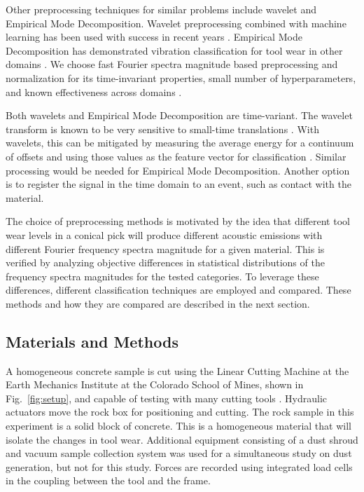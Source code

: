Other preprocessing techniques for similar problems include wavelet and Empirical Mode Decomposition.
Wavelet preprocessing combined with machine learning
has been used with success in recent years 
 \cite{he2013vibration, sadegh2016classification, skariah2021health}.
Empirical Mode Decomposition has demonstrated vibration classification for tool wear
 in other domains \cite{Xu2009, Nie2011, Zhan2014}.
We choose fast Fourier spectra magnitude based preprocessing and normalization for its time-invariant properties,
small number of hyperparameters, and known effectiveness across domains \cite{Xu2016, Harlianto2022}.

Both wavelets and Empirical Mode Decomposition are time-variant.
The wavelet transform is known to be very sensitive to small-time translations \cite{Yen1999}.
With wavelets, this can be mitigated by measuring the average energy for 
a continuum of offsets and using those values 
as the feature vector for classification \cite{Baccar2015}.
Similar processing would be needed for Empirical Mode Decomposition. 
Another option is to register the signal in the time domain to an event, such as contact with the material.

The choice of preprocessing methods is motivated by the idea that different tool wear levels in a conical pick 
will produce different acoustic emissions with different Fourier frequency spectra magnitude for a given material. 
This is verified by analyzing objective differences in statistical distributions of the frequency spectra magnitudes 
for the tested categories. To leverage these differences, different classification techniques are employed and compared. 
These methods and how they are compared are described in the next section.

\subsection{Materials and Methods}\label{sec2}

A homogeneous concrete sample is cut using the Linear Cutting Machine
at the Earth Mechanics Institute at the Colorado School of Mines, shown in Fig.~\ref{fig:setup},
and capable of testing with many cutting tools \cite{THYAGARAJAN2024105675}. 
Hydraulic actuators move the rock box for positioning and cutting. The rock sample in this experiment
is a solid block of concrete. This is a homogeneous material that will isolate the changes in tool wear.
Additional equipment consisting of a dust shroud and vacuum sample collection system was used for a
 simultaneous study on dust generation, but not for this study.
Forces are recorded using integrated load cells in the coupling between the tool and the frame.

